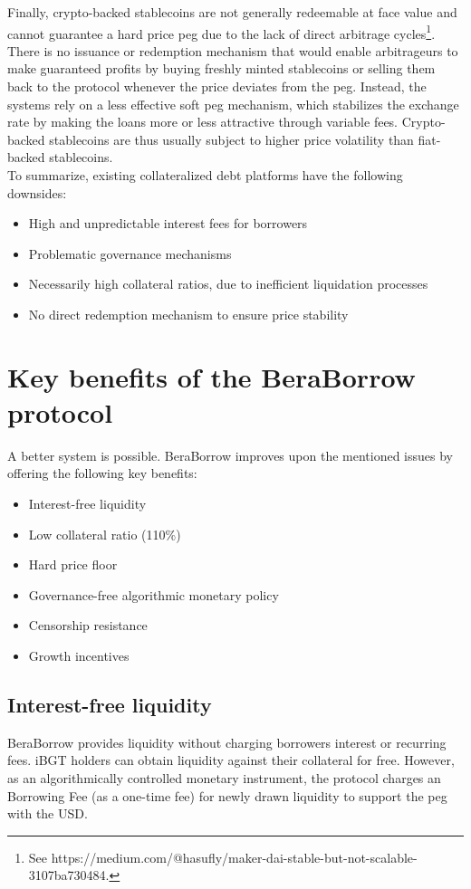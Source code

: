 \documentclass{article}
\begin{document}
Finally, crypto-backed stablecoins are not generally redeemable at face value and cannot guarantee a hard price peg due to the lack of direct arbitrage cycles\footnote{See https://medium.com/@hasufly/maker-dai-stable-but-not-scalable-3107ba730484.}. There is no issuance or redemption mechanism that would enable arbitrageurs to make guaranteed profits by buying freshly minted stablecoins or selling them back to the protocol whenever the price deviates from the peg. Instead, the systems rely on a less effective soft peg mechanism, which stabilizes the exchange rate by making the loans more or less attractive through variable fees. Crypto-backed stablecoins are thus usually subject to higher price volatility than fiat-backed stablecoins.\\

To summarize, existing collateralized debt platforms have the following downsides:
\begin{itemize}
    \item High and unpredictable interest fees for borrowers
    \item Problematic governance mechanisms
    \item Necessarily high collateral ratios, due to inefficient liquidation processes
    \item No direct redemption mechanism to ensure price stability
\end{itemize}
 
\section{Key benefits of the BeraBorrow protocol}
A better system is possible. BeraBorrow improves upon the mentioned issues by offering the following key benefits:
\begin{itemize}
    \item Interest-free liquidity
    \item Low collateral ratio (110\%)
    \item Hard price floor
    \item Governance-free algorithmic monetary policy
    \item Censorship resistance
    \item Growth incentives
\end{itemize}

\subsection{Interest-free liquidity}
BeraBorrow provides liquidity without charging borrowers interest or recurring fees. iBGT holders can obtain liquidity against their collateral for free. However, as an algorithmically controlled monetary instrument, the protocol charges an Borrowing Fee (as a one-time fee) for newly drawn liquidity to support the peg with the USD.
\end{document}
